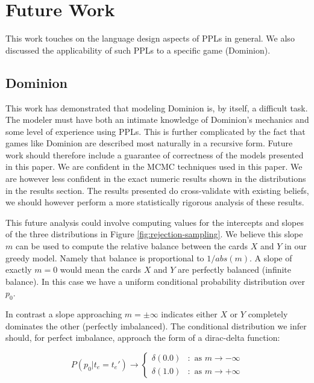 
\section{Future Work} \label{sec:future}

This work touches on the language design aspects of PPLs
in general. We also discussed the applicability of such PPLs
to a specific game (Dominion).

\subsection{Dominion} \label{sec:future:dominion}

This work has demonstrated that modeling Dominion is, by itself,
a difficult task. The modeler must have both an intimate knowledge
of Dominion's mechanics and some level of experience using PPLs.
This is further complicated by the fact that games like Dominion
are described most naturally in a recursive form. Future work should
therefore include a guarantee of correctness of the models presented
in this paper. We are confident in the MCMC techniques used in this
paper. We are however less confident in the exact numeric results
shown in the distributions in the results section. The results
presented do cross-validate with existing beliefs, we should however
perform a more statistically rigorous analysis of these
results.

This future analysis could involve computing values for the
intercepts and slopes of the three distributions in Figure
\ref{fig:rejection-sampling}. We believe this slope $m$ can be used
to compute the relative balance between the cards $X$ and $Y$ in
our greedy model. Namely that balance is proportional to
$1 / abs(m)$. A slope of exactly $m = 0$ would mean the cards
$X$ and $Y$ are perfectly balanced (infinite balance). In
this case we have a uniform conditional probability distribution
over $p_0$.

In contrast
a slope approaching $m = \pm \infty$ indicates either $X$ or $Y$
completely dominates the other (perfectly imbalanced). The
conditional distribution we infer should, for perfect imbalance,
approach the form of a dirac-delta function:

$$P(p_0 | t_e = t_e') \rightarrow \left\{
  \begin{array}{lr}
    \delta(0.0) & : \textrm{ as } m \rightarrow -\infty \\
    \delta(1.0) & : \textrm{ as } m \rightarrow +\infty
  \end{array}
\right.
$$

